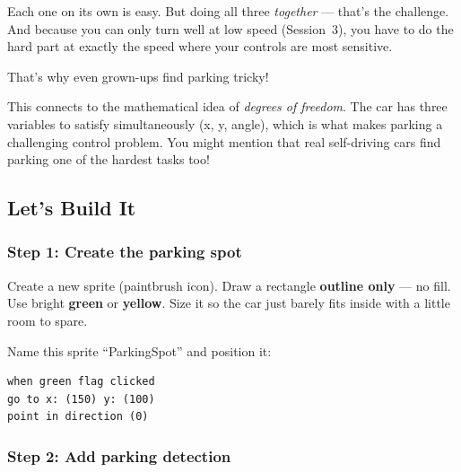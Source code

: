 \documentclass[11pt,a4paper]{article}
\newcommand{\drawcar}[4][]{%
  \begin{scope}[shift={(#2,#3)},rotate=#4,#1]
    \fill[carred,rounded corners=4pt] (-0.25,-0.6) rectangle (0.25,0.6);
    \fill[carred] (-0.2,0.6) -- (0,0.85) -- (0.2,0.6) -- cycle;
    \fill[black!80] (-0.35,-0.45) rectangle (-0.25,-0.25);
    \fill[black!80] (0.25,-0.45) rectangle (0.35,-0.25);
    \fill[black!80] (-0.35,0.25) rectangle (-0.25,0.45);
    \fill[black!80] (0.25,0.25) rectangle (0.35,0.45);
    \fill[white] (0,0) circle (0.04);
  \end{scope}
}
\begin{document}
Each one on its own is easy. But doing all three \emph{together} --- that's the challenge. And because you can only turn well at low speed (Session~3), you have to do the hard part at exactly the speed where your controls are most sensitive.

That's why even grown-ups find parking tricky!

\begin{parentbox}
This connects to the mathematical idea of \emph{degrees of freedom}. The car has three variables to satisfy simultaneously (x, y, angle), which is what makes parking a challenging control problem. You might mention that real self-driving cars find parking one of the hardest tasks too!
\end{parentbox}

\subsection{Let's Build It}

\subsubsection{Step 1: Create the parking spot}

Create a new sprite (paintbrush icon). Draw a rectangle \textbf{outline only} --- no fill. Use bright \textbf{green} or \textbf{yellow}. Size it so the car just barely fits inside with a little room to spare.

Name this sprite ``ParkingSpot'' and position it:

\begin{scratchblockbox}
\begin{lstlisting}[style=scratch]
when green flag clicked
go to x: (150) y: (100)
point in direction (0)
\end{lstlisting}
\end{scratchblockbox}

\begin{center}
\end{center}

\subsubsection{Step 2: Add parking detection}
\end{document}
